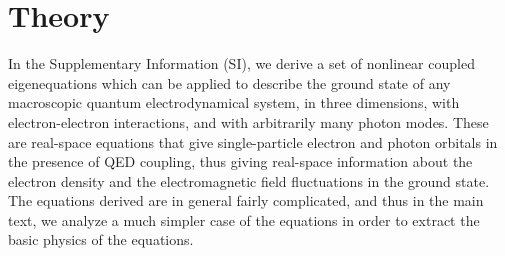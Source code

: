 \documentclass[aps,prb,twocolumn,
	groupedaddress,superscriptaddress,
	amsfonts,amssymb,amsmath,floatfix,
	citeautoscript]{revtex4-1}
\begin{document}
\section{Theory}
\label{sec:theory}
In the Supplementary Information (SI), we derive a set of nonlinear coupled eigenequations which can be applied to describe the ground state of any macroscopic quantum electrodynamical system, in three dimensions, with electron-electron interactions, and with arbitrarily many photon modes. These are real-space equations that give single-particle electron and photon orbitals in the presence of QED coupling, thus giving real-space information about the electron density and the electromagnetic field fluctuations in the ground state. The equations derived are in general fairly complicated, and thus in the main text, we analyze a much simpler case of the equations in order to extract the basic physics of the equations. 
\end{document}
